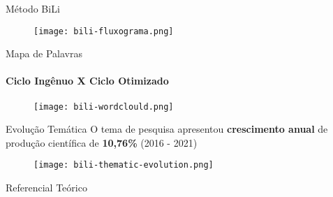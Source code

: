 \begin{frame}[c]{Método BiLi}
    \begin{figure}
        \centering
        \texttt{[image: bili-fluxograma.png]}
    \end{figure}
\end{frame}

\begin{frame}[c]{Mapa de Palavras}
    \framesubtitle{Ciclo Ingênuo X Ciclo Otimizado}
    \begin{figure}
        \centering
        \texttt{[image: bili-wordclould.png]}
    \end{figure}
\end{frame}

\begin{frame}[c]{Evolução Temática}
    O tema de pesquisa apresentou \textbf{crescimento anual} de produção científica de \textbf{10,76\%} (2016 - 2021)\\
    \begin{figure}
        \centering
        \texttt{[image: bili-thematic-evolution.png]}
    \end{figure}
\end{frame}

\begin{frame}[c]{Referencial Teórico}
    
\end{frame}

